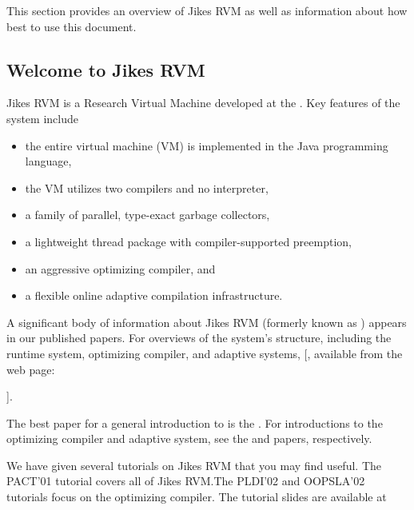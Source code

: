 This section provides an overview of Jikes\TMweb{} RVM as well as
information about how best to use this document.

\subsection{Welcome to Jikes RVM}

Jikes\TMboth{} RVM is a Research Virtual Machine 
 developed at the 
.  Key
features of the system include
\begin{itemize}
\item the entire virtual machine (VM) is implemented in the
  Java\TMboth{} programming language,
\item the VM utilizes two compilers and no interpreter,
\item a family of parallel, type-exact garbage collectors,
\item a lightweight thread package with compiler-supported preemption,
\item an aggressive optimizing compiler, and 
\item a flexible online adaptive compilation infrastructure.
\end{itemize}

A significant body of information about Jikes RVM 
(formerly known as 
\xlink{\jp}{\JalapenoHomeURL}) appears 
in our published
papers.  For overviews of the system's structure, including the runtime system,
optimizing compiler, and adaptive systems, [, available from the \jrvm{} web page:
\begin{quote}
\texttt{\RVMPubsURL}
\end{quote}
]{\RVMPubsURL}.

The best paper for a general introduction to \jrvm{} is the 
.  
For introductions to the
optimizing compiler and adaptive system, see the 
{\JavaGrandePaperURL}
 and 
{\tt \OOPSLAPaperURL}  
papers, respectively.

We have given several tutorials on Jikes RVM that you may find
useful. The PACT'01 tutorial covers all of Jikes RVM.\@  The PLDI'02 and
OOPSLA'02 tutorials focus on the optimizing compiler.  The tutorial
slides are available at
\begin{quote}
\xlink{{\tt \RVMSlidesURL}}{\RVMSlidesURL}
\end{quote}

